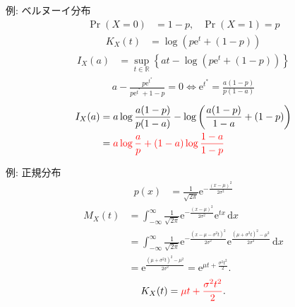 \documentclass[lualatex,handout]{beamer}
\newcommand{\emm}[1]{\textcolor{red}{#1}}
\newcommand\dx{{\,\mathrm{d}x}}
\theoremstyle{definition}
\begin{document}
\begin{frame}{例: ベルヌーイ分布}
\begin{align*}
\Pr(X=0) &= 1-p,&\Pr(X=1)=p
\end{align*}
\begin{align*}
K_X(t) &= \log(p\mathrm{e}^t + (1-p))
\end{align*}
\begin{align*}
I_X(a) &= \sup_{t\in\mathbb{R}} \left\{ at - \log(p\mathrm{e}^t+(1-p))\right\}
\end{align*}
\begin{align*}
a - \frac{p\mathrm{e}^{t^*}}{p\mathrm{e}^{t^*}+1-p} = 0
\iff \mathrm{e}^{t^*} = \frac{a(1-p)}{p(1-a)}
\end{align*}
\begin{align*}
I_X(a) &= a\log\frac{a(1-p)}{p(1-a)} - \log\left(\frac{a(1-p)}{1-a} + (1-p)\right)\\
 &= \emm{a\log\frac{a}{p} + (1-a)\log\frac{1-a}{1-p}}
\end{align*}
\end{frame}

\begin{frame}{例: 正規分布}
\begin{align*}
p(x) &= \frac1{\sqrt{2\pi}} \mathrm{e}^{-\frac{(x-\mu)^2}{2\sigma^2}}
\end{align*}
\begin{align*}
M_X(t) &= \int_{-\infty}^\infty\frac1{\sqrt{2\pi}} \mathrm{e}^{-\frac{(x-\mu)^2}{2\sigma^2}} \mathrm{e}^{tx}\dx\\
 &= \int_{-\infty}^\infty\frac1{\sqrt{2\pi}} \mathrm{e}^{-\frac{(x-\mu -\sigma^2t)^2}{2\sigma^2}} \mathrm{e}^{\frac{(\mu+\sigma^2t)^2-\mu^2}{2\sigma^2}}\dx\\
&=\mathrm{e}^{\frac{(\mu+\sigma^2t)^2-\mu^2}{2\sigma^2}}
=\mathrm{e}^{\mu t + \frac{\sigma^2t^2}2}.
\end{align*}
\begin{align*}
K_X(t) &= \emm{\mu t + \frac{\sigma^2t^2}2}.\\
\end{align*}
\end{frame}
\end{document}
